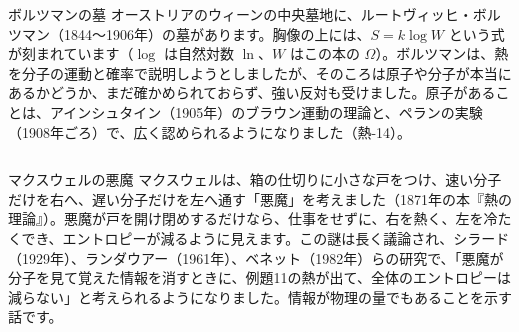 \begin{column}{ボルツマンの墓}
オーストリアのウィーンの中央墓地に、ルートヴィッヒ・ボルツマン（1844〜1906年）の墓があります。胸像の上には、$S=k\log W$ という式が刻まれています（$\log$ は自然対数 $\ln$、$W$ はこの本の $\Omega$）。ボルツマンは、熱を分子の運動と確率で説明しようとしましたが、そのころは原子や分子が本当にあるかどうか、まだ確かめられておらず、強い反対も受けました。原子があることは、アインシュタイン（1905年）のブラウン運動の理論と、ペランの実験（1908年ごろ）で、広く認められるようになりました（熱-14）。
\end{column}

\begin{column}{マクスウェルの悪魔}
マクスウェルは、箱の仕切りに小さな戸をつけ、速い分子だけを右へ、遅い分子だけを左へ通す「悪魔」を考えました（1871年の本『熱の理論』）。悪魔が戸を開け閉めするだけなら、仕事をせずに、右を熱く、左を冷たくでき、エントロピーが減るように見えます。この謎は長く議論され、シラード（1929年）、ランダウアー（1961年）、ベネット（1982年）らの研究で、「悪魔が分子を見て覚えた情報を消すときに、例題11の熱が出て、全体のエントロピーは減らない」と考えられるようになりました。情報が物理の量でもあることを示す話です。
\end{column}

